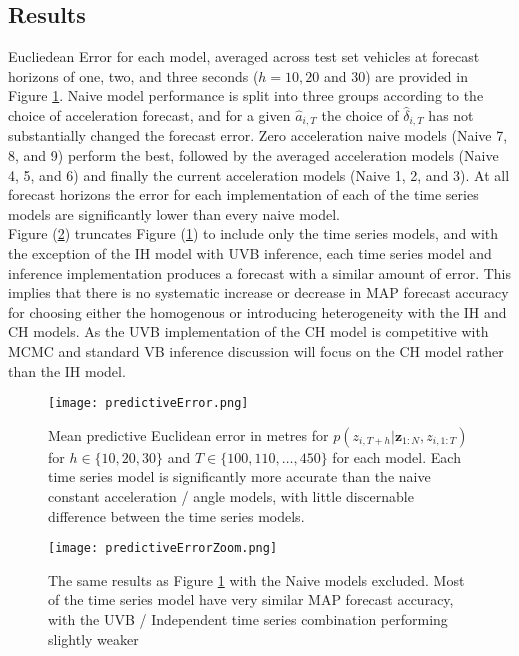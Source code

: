 \documentclass[12pt,a4paper]{article}\usepackage[]{graphicx}\usepackage[]{color}
\begin{document}
\subsection{Results}
\label{subsec:Results}

Eucliedean Error for each model, averaged across test set vehicles at forecast horizons of one, two, and three seconds ($h = 10, 20$ and $30$) are provided in Figure \ref{fig:PredError}. Naive model performance is split into three groups according to the choice of acceleration forecast, and for a given $\hat{a}_{i, T}$ the choice of $\hat{\delta}_{i, T}$ has not substantially changed the forecast error. Zero acceleration naive models (Naive 7, 8, and 9) perform the best, followed by the averaged acceleration models (Naive 4, 5, and 6) and finally the current acceleration models (Naive 1, 2, and 3). At all forecast horizons the error for each implementation of each of the time series models are significantly lower than every naive model.
\\

Figure (\ref{fig:PredErrorZ}) truncates Figure (\ref{fig:PredError}) to include only the time series models, and with the exception of the IH model with UVB inference, each time series model and inference implementation produces a forecast with a similar amount of error. This implies that there is no systematic increase or decrease in MAP forecast accuracy for choosing either the homogenous or introducing heterogeneity with the IH and CH models. As the UVB implementation of the CH model is competitive with MCMC and standard VB inference discussion will focus on the CH model rather than the IH model.
\\

\begin{figure}[ht]
\centering
\texttt{[image: predictiveError.png]}
\caption{Mean predictive Euclidean error in metres for $p(z_{i, T+h} | \textbf{z}_{1:N}, z_{i, 1:T})$ for $h \in \{10, 20, 30\}$ and $T \in \{100, 110, \dots, 450\}$ for each model. Each time series model is significantly more accurate than the naive constant acceleration / angle models, with little discernable difference between the time series models.}
\label{fig:PredError}
\end{figure}

\begin{figure}[ht]
\centering
\texttt{[image: predictiveErrorZoom.png]}
\caption{The same results as Figure \ref{fig:PredError} with the Naive models excluded. Most of the time series model have very similar MAP forecast accuracy, with the UVB / Independent time series combination performing slightly weaker}
\label{fig:PredErrorZ}
\end{figure}
\end{document}
